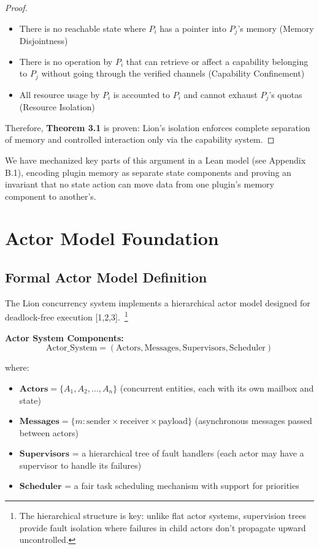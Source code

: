 \begin{proof}
\begin{itemize}
\item There is no reachable state where $P_i$ has a pointer into $P_j$'s memory (Memory Disjointness)
\item There is no operation by $P_i$ that can retrieve or affect a capability belonging to $P_j$ without going through the verified channels (Capability Confinement)
\item All resource usage by $P_i$ is accounted to $P_i$ and cannot exhaust $P_j$'s quotas (Resource Isolation)
\end{itemize}

Therefore, \textbf{Theorem 3.1} is proven: Lion's isolation enforces complete separation of memory and controlled interaction only via the capability system.
\end{proof}

\begin{remark}
We have mechanized key parts of this argument in a Lean model (see Appendix B.1), encoding plugin memory as separate state components and proving an invariant that no state action can move data from one plugin's memory component to another's.
\end{remark}

\newpage

\section{Actor Model Foundation}

\subsection{Formal Actor Model Definition}

The Lion concurrency system implements a hierarchical actor model designed for deadlock-free execution [1,2,3].~\footnote{The hierarchical structure is key: unlike flat actor systems, supervision trees provide fault isolation where failures in child actors don't propagate upward uncontrolled.}

\textbf{Actor System Components:}
\begin{equation}
\text{Actor\_System} = (\text{Actors}, \text{Messages}, \text{Supervisors}, \text{Scheduler})
\end{equation}

where:
\begin{itemize}
\item $\textbf{Actors} = \{A_1, A_2, \ldots, A_n\}$ (concurrent entities, each with its own mailbox and state)
\item $\textbf{Messages} = \{m: \text{sender} \times \text{receiver} \times \text{payload}\}$ (asynchronous messages passed between actors)
\item $\textbf{Supervisors}$ = a hierarchical tree of fault handlers (each actor may have a supervisor to handle its failures)
\item $\textbf{Scheduler}$ = a fair task scheduling mechanism with support for priorities
\end{itemize}

